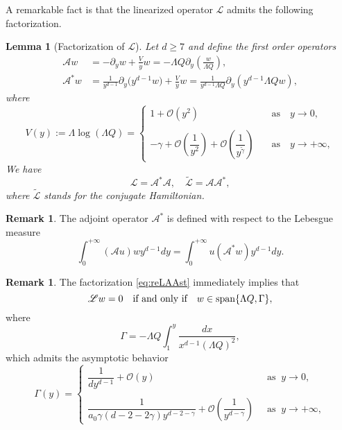 \documentclass[11pt]{aims}
\newtheorem{lemma}[theorem]{Lemma}
\theoremstyle{definition}
\newtheorem{remark}[theorem]{Remark}
\numberwithin{equation}{section}
\begin{document}
A remarkable fact is that the linearized operator ${\mathscr{L}}$ admits the following factorization.
\begin{lemma}[Factorization of ${\mathscr{L}}$] \label{lemm:factorL}  Let $d \geq 7$ and define the first order operators
\begin{align}
{\mathscr{A}} w  &= -\partial_y w + \frac{V}{y}w = - \Lambda Q \partial_y \left(\frac{w}{\Lambda Q}\right), \label{def:As}\\ 
{\mathscr{A}}^* w &= \frac{1}{y^{d-1}}\partial_y \big(y^{d-1}w\big) + \frac{V}{y}w  =  \frac{1}{y^{d-1}\Lambda Q} \partial_y \left(y^{d-1} \Lambda Q w\right),\label{def:Astar}
\end{align}
where
\begin{equation}\label{eq:asympV}
V(y) := \Lambda \log(\Lambda Q) =  \left\{\begin{array}{ll}
1 + {\mathcal{O}}(y^2)\quad &\text{as}\quad y \to 0, \\
&\\
-\gamma + {\mathcal{O}}\left(\dfrac 1{y^{2}}\right)+ {\mathcal{O}}\left(\dfrac 1{y^{\tilde{\gamma}}}\right)\quad &\text{as} \quad y \to + \infty,
\end{array}
\right.
\end{equation}
We have
\begin{equation}\label{eq:reLAAst}
{\mathscr{L}} = {\mathscr{A}}^* {\mathscr{A}}, \quad \tilde{\mathscr{L}} = {\mathscr{A}} {\mathscr{A}}^*,
\end{equation}
where $\tilde{\mathscr{L}}$ stands for the conjugate Hamiltonian.
\end{lemma}

\begin{remark} The adjoint operator ${\mathscr{A}}^*$ is defined with respect to the Lebesgue measure
$$\int _0^{+\infty}({\mathscr{A}} u) w y^{d-1}dy = \int_{0}^{+\infty} u({\mathscr{A}}^* w)y^{d-1}dy.$$
\end{remark}

\begin{remark} The factorization \eqref{eq:reLAAst} immediately implies that 
$${\mathscr{L}} w = 0 \quad \text{if and only if} \quad w \in \textup{span}\{\Lambda Q, \Gamma\},$$
where 
$$\Gamma = -\Lambda Q \int_1^y \frac{dx}{x^{d-1}(\Lambda Q)^2},$$
which admits the asymptotic behavior
\begin{equation}\label{eq:asymGamma}
\Gamma(y) = \left\{\begin{array}{ll}
\dfrac{1}{d y^{d-1}} + {\mathcal{O}}(y)\;\; &\text{as}\;\; y \to 0, \\
&\\
\dfrac{1}{a_0 \gamma (d - 2 - 2\gamma) y^{d - 2 - \gamma}} + {\mathcal{O}}\left(\dfrac 1{y^{d - \gamma}}\right)\;\; &\text{as} \;\; y \to + \infty,
\end{array}
\right.
\end{equation}
\end{remark}
\end{document}
